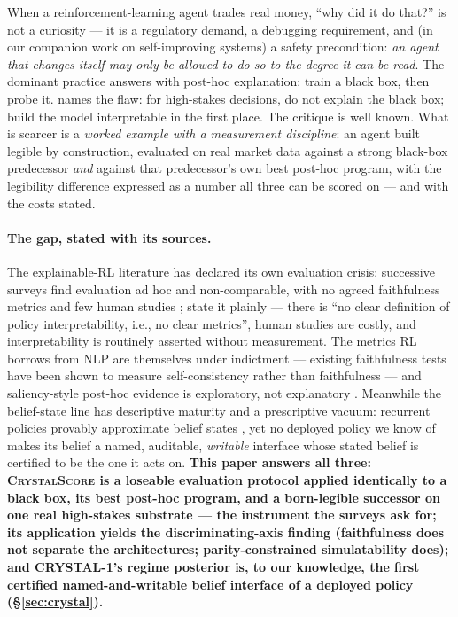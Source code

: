 \documentclass[11pt]{article}
\begin{document}
When a reinforcement-learning agent trades real money, ``why did it do that?'' is not a
curiosity --- it is a regulatory demand, a debugging requirement, and (in our companion work on
self-improving systems) a safety precondition: \emph{an agent that changes itself may only be
allowed to do so to the degree it can be read}. The dominant practice answers with post-hoc
explanation: train a black box, then probe it. \citet{rudin2019} names the flaw: for high-stakes
decisions, do not explain the black box; build the model interpretable in the first place. The
critique is well known. What is scarcer is a \emph{worked example with a measurement
discipline}: an agent built legible by construction, evaluated on real market data against a
strong black-box predecessor \emph{and} against that predecessor's own best post-hoc program,
with the legibility difference expressed as a number all three can be scored on --- and with the
costs stated.

\paragraph{The gap, stated with its sources.} The explainable-RL literature has declared its
own evaluation crisis: successive surveys find evaluation ad hoc and non-comparable, with no
agreed faithfulness metrics and few human studies \citep{milani2024,vouros2023};
\citet{kohler2025} state it plainly --- there is ``no clear definition of policy
interpretability, i.e., no clear metrics'', human studies are costly, and interpretability is
routinely asserted without measurement. The metrics RL borrows from NLP are themselves under
indictment --- existing faithfulness tests have been shown to measure self-consistency rather
than faithfulness \citep{parcalabescu2024} --- and saliency-style post-hoc evidence is
exploratory, not explanatory \citep{atrey2020}. Meanwhile the belief-state line has descriptive
maturity and a prescriptive vacuum: recurrent policies provably approximate belief states
\citep{lambrechts2022}, yet no deployed policy we know of makes its belief a named, auditable,
\emph{writable} interface whose stated belief is certified to be the one it acts on.
\textbf{This paper answers all three: \textsc{CrystalScore} is a loseable evaluation protocol
applied identically to a black box, its best post-hoc program, and a born-legible successor on
one real high-stakes substrate --- the instrument the surveys ask for; its application yields
the discriminating-axis finding (faithfulness does not separate the architectures;
parity-constrained simulatability does); and CRYSTAL-1's regime posterior is, to our knowledge,
the first certified named-and-writable belief interface of a deployed policy
(\S\ref{sec:crystal}).}
\end{document}

